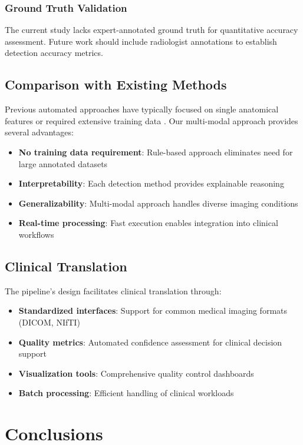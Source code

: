 \documentclass[11pt,a4paper]{article}
\begin{document}
\subsubsection{Ground Truth Validation}
The current study lacks expert-annotated ground truth for quantitative accuracy assessment. Future work should include radiologist annotations to establish detection accuracy metrics.

\subsection{Comparison with Existing Methods}

Previous automated approaches have typically focused on single anatomical features or required extensive training data \cite{ref9,ref10}. Our multi-modal approach provides several advantages:

\begin{itemize}
\item \textbf{No training data requirement}: Rule-based approach eliminates need for large annotated datasets
\item \textbf{Interpretability}: Each detection method provides explainable reasoning
\item \textbf{Generalizability}: Multi-modal approach handles diverse imaging conditions
\item \textbf{Real-time processing}: Fast execution enables integration into clinical workflows
\end{itemize}

\subsection{Clinical Translation}

The pipeline's design facilitates clinical translation through:

\begin{itemize}
\item \textbf{Standardized interfaces}: Support for common medical imaging formats (DICOM, NIfTI)
\item \textbf{Quality metrics}: Automated confidence assessment for clinical decision support
\item \textbf{Visualization tools}: Comprehensive quality control dashboards
\item \textbf{Batch processing}: Efficient handling of clinical workloads
\end{itemize}

\section{Conclusions}
\end{document}
